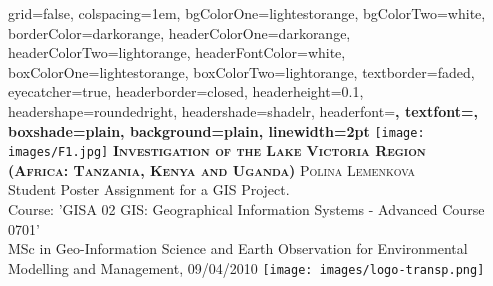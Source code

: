 \documentclass[portrait,final,a0paper,fontscale=0.277]{baposter}
\begin{document}

\begin{poster}%
  {
  grid=false,
  colspacing=1em,
  bgColorOne=lightestorange,
  bgColorTwo=white,
  borderColor=darkorange,
  headerColorOne=darkorange,
  headerColorTwo=lightorange,
  headerFontColor=white,
  boxColorOne=lightestorange,
  boxColorTwo=lightorange,
  textborder=faded,
  eyecatcher=true,
  headerborder=closed,
  headerheight=0.1\textheight,
  headershape=roundedright,
  headershade=shadelr,
  headerfont=\Large\bf\textsc, %
  textfont={\setlength{\parindent}{1.5em}},
  boxshade=plain,
  background=plain,
  linewidth=2pt
  }
  {\texttt{[image: images/F1.jpg]}} 
  {\bf\textsc{\LARGE{Investigation of the Lake Victoria Region\\ (Africa: Tanzania, Kenya and Uganda)}}\vspace{0.5em}}
  {\textsc{\large{Polina Lemenkova}}\\
  \small{Student Poster Assignment for a GIS Project. \\
Course: 'GISA 02 GIS: Geographical Information Systems - Advanced Course 0701'} \\
\footnotesize{MSc in Geo-Information Science and Earth Observation for Environmental Modelling and Management, 09/04/2010}
}
  {%
    \texttt{[image: images/logo-transp.png]}
  }

\newcommand{\colouredcircle}{%
      \tikz{\useasboundingbox (-0.2em,-0.32em) rectangle(0.2em,0.32em); \draw[draw=black,fill=lightblue,line width=0.03em] (0,0) circle(0.18em);}}
      



\end{poster}
\end{document}
